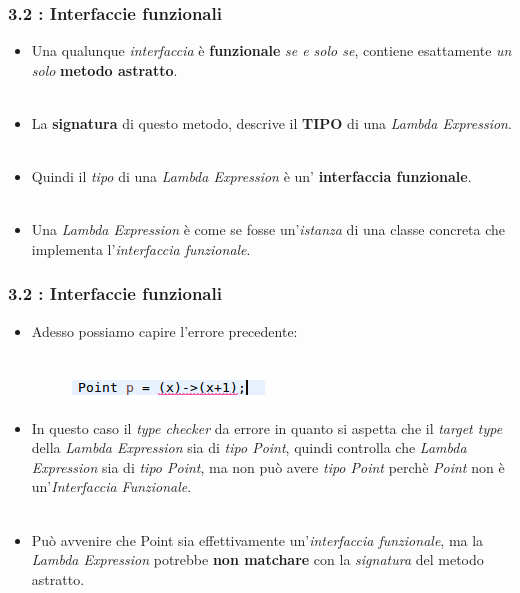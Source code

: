 \documentclass{beamer}
\begin{document}
\begin{frame}
	\frametitle{\textbf{3.2 : Interfaccie funzionali}}
	\begin{itemize}
		\item
			Una qualunque \textit{interfaccia} è \textbf{funzionale} \textit{se e solo se}, contiene esattamente \textit{un solo} \textbf{metodo astratto}.\\\
		\item 
			La \textbf{signatura} di questo metodo, descrive il \textbf{TIPO} di una \textit{Lambda Expression}.\\\
		\item 
			Quindi il \textit{tipo} di una \textit{Lambda Expression} è un' \textbf{interfaccia funzionale}.\\\
		\item 
			Una \textit{Lambda Expression} è come se fosse un'\textit{istanza} di una classe concreta che implementa l'\textit{interfaccia funzionale}.
	\end{itemize}
\end{frame}


\begin{frame}
	\frametitle{\textbf{3.2 : Interfaccie funzionali}}
	\begin{itemize}
		\item
			Adesso possiamo capire l'errore precedente:\\\
			\begin{figure}
				\centering
				\includegraphics[width=0.3\linewidth]{image/target.png}
				\label{fig:target}
			\end{figure}
		\item
			In questo caso il \textit{type checker} da errore in quanto si aspetta che il \textit{target type} della \textit{Lambda Expression} sia di \textit{tipo Point}, quindi controlla che \textit{Lambda Expression} sia di \textit{tipo Point}, ma non può avere \textit{tipo Point} perchè \textit{Point} non è un'\textit{Interfaccia Funzionale}.\\\
		\item
			Può avvenire che Point sia effettivamente un'\textit{interfaccia funzionale}, ma la \textit{Lambda Expression} potrebbe \textbf{non matchare} con la \textit{signatura} del metodo astratto.
	\end{itemize}
\end{frame}
\end{document}
